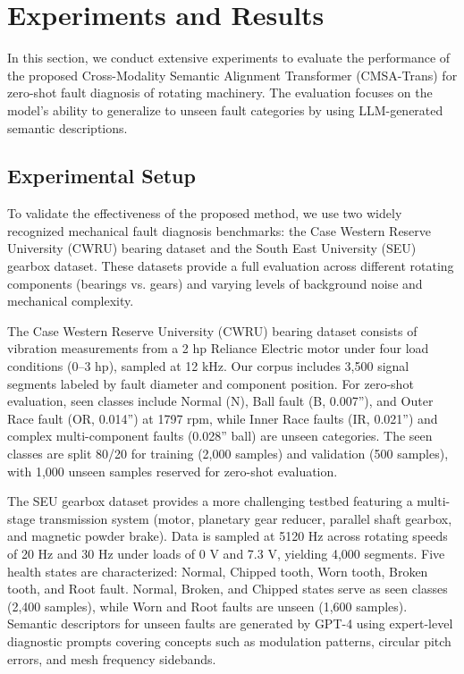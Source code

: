 \section{Experiments and Results}
In this section, we conduct extensive experiments to evaluate the performance of the proposed Cross-Modality Semantic Alignment Transformer (CMSA-Trans) for zero-shot fault diagnosis of rotating machinery. The evaluation focuses on the model's ability to generalize to unseen fault categories by using LLM-generated semantic descriptions.

\subsection{Experimental Setup}
To validate the effectiveness of the proposed method, we use two widely recognized mechanical fault diagnosis benchmarks: the Case Western Reserve University (CWRU) bearing dataset and the South East University (SEU) gearbox dataset. These datasets provide a full evaluation across different rotating components (bearings vs. gears) and varying levels of background noise and mechanical complexity.

The Case Western Reserve University (CWRU) bearing dataset consists of vibration measurements from a 2 hp Reliance Electric motor under four load conditions (0--3 hp), sampled at 12 kHz. Our corpus includes 3,500 signal segments labeled by fault diameter and component position. For zero-shot evaluation, seen classes include Normal (N), Ball fault (B, 0.007''), and Outer Race fault (OR, 0.014'') at 1797 rpm, while Inner Race faults (IR, 0.021'') and complex multi-component faults (0.028'' ball) are unseen categories. The seen classes are split 80/20 for training (2,000 samples) and validation (500 samples), with 1,000 unseen samples reserved for zero-shot evaluation.

The SEU gearbox dataset provides a more challenging testbed featuring a multi-stage transmission system (motor, planetary gear reducer, parallel shaft gearbox, and magnetic powder brake). Data is sampled at 5120 Hz across rotating speeds of 20 Hz and 30 Hz under loads of 0 V and 7.3 V, yielding 4,000 segments. Five health states are characterized: Normal, Chipped tooth, Worn tooth, Broken tooth, and Root fault. Normal, Broken, and Chipped states serve as seen classes (2,400 samples), while Worn and Root faults are unseen (1,600 samples). Semantic descriptors for unseen faults are generated by GPT-4 using expert-level diagnostic prompts covering concepts such as modulation patterns, circular pitch errors, and mesh frequency sidebands.

